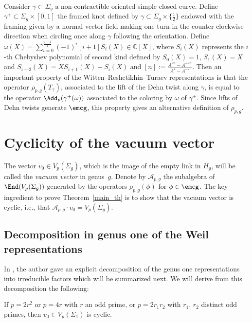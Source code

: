 Consider $\gamma\subset \Sigma_g$ a non-contractible oriented simple closed curve. Define $\gamma^+\subset \Sigma_g\times [0,1]$ the framed knot defined by $\gamma\subset \Sigma_g\times \big\{ \frac{1}{2} \big\}$ endowed with the framing given by a normal vector field making one turn in the counter-clockwise direction when circling once along $\gamma$ following the orientation. Define $\omega(X)=\sum\limits_{i=0}^ {\frac{p-4}{2}} (-1)^i [i+1]S_i(X) \in \mathbb{C}[X]$, where $S_i(X)$ represents the $i$-{th} Chebyshev polynomial of second kind defined by $S_0(X)=1$, $S_1(X)=X$ and $S_{i+2}(X)=XS_{i+1}(X)-S_i(X) $ and $[n]:= \frac{A^{2n}-A^{-2n}}{A^2 - A^{-2}}$. Then an important property of the Witten--Reshetikhin--Turaev representations is that the operator $\rho_{p,g}(T_{\gamma})$, associated to the lift of the Dehn twist along $\gamma$, is equal to the operator $\Add_p(\gamma^+(\omega))$ associated to the coloring by $\omega$ of $\gamma^+$. Since lifts of Dehn twists generate $\emcg$, this property gives an alternative definition of $\rho_{p,g}$.

\section{Cyclicity of the vacuum vector}

The vector $v_0\in V_p(\Sigma_g)$, which is the image of the empty link in $H_g$, will be called the \textit{vacuum vector} in genus~$g$. Denote by $\mathcal{A}_{p,g}$ the subalgebra of $\End(V_p(\Sigma_g))$ generated by the operators $\rho_{p,g}(\phi)$ for $\phi \in \emcg$. The key ingredient to prove Theorem~\ref{main_th} is to show that the vacuum vector is cyclic, i.e., that $\mathcal{A}_{p,g}\cdot v_0 =V_p(\Sigma_g)$.

\subsection{Decomposition in genus one of the Weil representations}
In \cite[Corollary 1.2]{Koju1}, the author gave an explicit decomposition of the genus one representations into irreducible factors which will be summarized next. We will derive from this decomposition the following:
\begin{Lemma}\label{lemma_genusone1} If $p=2r^2$ or $p=4r$ with $r$ an odd prime, or $p=2r_1r_2$ with $r_1$, $r_2$ distinct odd primes, then $v_0 \in V_p(\Sigma_1)$ is cyclic.
\end{Lemma}

